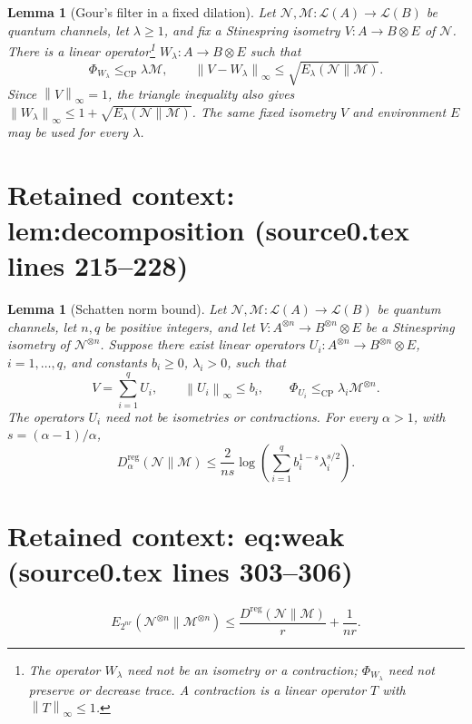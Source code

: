\documentclass[10pt,a4paper]{amsart}
\newcommand{\Dt}{D}
\newcommand{\M}{\mathcal M}
\newcommand{\N}{\mathcal N}
\newcommand{\cL}{\mathcal L}
\newcommand{\cp}{\mathrm{CP}}
\newcommand{\norm}[1]{\left\lVert#1\right\rVert}
\newcommand{\reg}{\mathrm{reg}}
\theoremstyle{plain}
\newtheorem{lemma}[theorem]{Lemma}
\begin{document}
\begin{lemma}[Gour's filter in a fixed dilation]\label{lem:filter}
Let $\N,\M:\cL(A)\to\cL(B)$ be quantum channels, let $\lambda\ge1$, and fix a Stinespring isometry $V:A\to B\otimes E$ of $\N$. There is a linear operator\footnote{The operator $W_\lambda$ need not be an isometry or a contraction; $\Phi_{W_\lambda}$ need not preserve or decrease trace. A contraction is a linear operator $T$ with $\norm{T}_\infty\le1$.} $W_\lambda:A\to B\otimes E$ such that
\begin{equation}\label{eq:filter}
 \Phi_{W_\lambda}\le_{\cp}\lambda\M,\qquad
 \norm{V-W_\lambda}_\infty\le\sqrt{E_\lambda(\N\|\M)}.
\end{equation}
Since $\norm V_\infty=1$, the triangle inequality also gives
$\norm{W_\lambda}_\infty\le1+\sqrt{E_\lambda(\N\|\M)}$.
The same fixed isometry $V$ and environment $E$ may be used for every $\lambda$.
\end{lemma}


\section*{Retained context: lem:decomposition (source0.tex lines 215--228)}

\begin{lemma}[Schatten norm bound]\label{lem:decomposition}
Let $\N,\M:\cL(A)\to\cL(B)$ be quantum channels, let $n,q$ be positive integers, and let $V:A^{\otimes n}\to B^{\otimes n}\otimes E$ be a Stinespring isometry of $\N^{\otimes n}$. Suppose there exist linear operators $U_i:A^{\otimes n}\to B^{\otimes n}\otimes E$, $i=1,\ldots,q$, and constants $b_i\ge0$, $\lambda_i>0$, such that
\[
 V=\sum_{i=1}^q U_i,\qquad
 \norm{U_i}_\infty\le b_i,\qquad
 \Phi_{U_i}\le_{\cp}\lambda_i\M^{\otimes n}.
\]
The operators $U_i$ need not be isometries or contractions. For every $\alpha>1$, with $s=(\alpha-1)/\alpha$,
\begin{equation}\label{eq:decomposition}
 \Dt_\alpha^{\reg}(\N\|\M)
 \le\frac{2}{ns}\log\left(\sum_{i=1}^q
               b_i^{1-s}\lambda_i^{s/2}\right).
\end{equation}
\end{lemma}


\section*{Retained context: eq:weak (source0.tex lines 303--306)}

\begin{equation}\label{eq:weak}
 E_{2^{nr}}(\N^{\otimes n}\|\M^{\otimes n})
 \le\frac{D^{\reg}(\N\|\M)}r+\frac1{nr}.
\end{equation}
\end{document}

